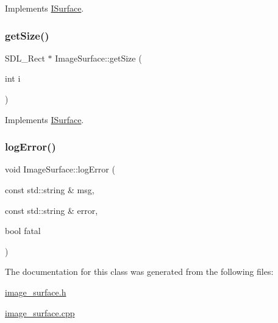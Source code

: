 Implements \mbox{\hyperlink{class_i_surface_a1553f92deac310771e6fe63d62fc1d95}{I\+Surface}}.

\mbox{\label{class_image_surface_ac0367fc1d7f0936f5dc6e56118356fff}} 
\subsubsection{\texorpdfstring{get\+Size()}{getSize()}}
{\footnotesize\ttfamily S\+D\+L\+\_\+\+Rect $\ast$ Image\+Surface\+::get\+Size (\begin{DoxyParamCaption}\item[{int}]{i }\end{DoxyParamCaption})\hspace{0.3cm}{\ttfamily [virtual]}}



Implements \mbox{\hyperlink{class_i_surface_ae0b5040cd0eaa1897f61f994f7b2eacf}{I\+Surface}}.

\mbox{\label{class_image_surface_ae19ffbda1d4279894b74f95b0afb81cb}} 
\subsubsection{\texorpdfstring{log\+Error()}{logError()}}
{\footnotesize\ttfamily void Image\+Surface\+::log\+Error (\begin{DoxyParamCaption}\item[{const std\+::string \&}]{msg,  }\item[{const std\+::string \&}]{error,  }\item[{bool}]{fatal }\end{DoxyParamCaption})\hspace{0.3cm}{\ttfamily [virtual]}}



The documentation for this class was generated from the following files\+:\begin{DoxyCompactItemize}
\item 
\mbox{\hyperlink{image__surface_8h}{image\+\_\+surface.\+h}}\item 
\mbox{\hyperlink{image__surface_8cpp}{image\+\_\+surface.\+cpp}}\end{DoxyCompactItemize}
